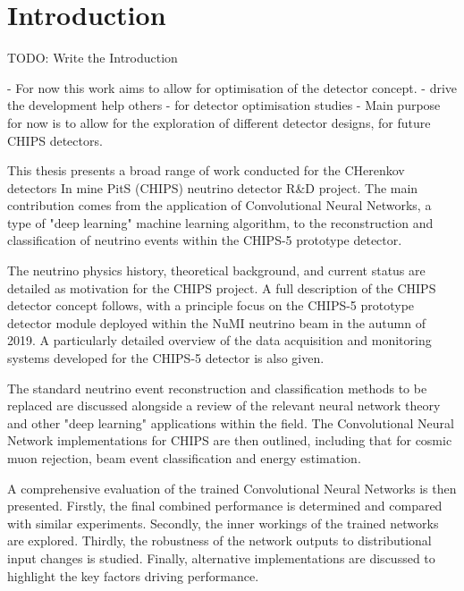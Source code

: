 \chapter{Introduction} %
\label{chap:introduction} %
\setcounter{page}{17}  %

TODO: Write the Introduction

- For now this work aims to allow for optimisation of the \chips detector concept.
- drive the development help others
- for detector optimisation studies
- Main purpose for now is to allow for the exploration of different detector designs, for future
CHIPS detectors.

This thesis presents a broad range of work conducted for the CHerenkov detectors In mine PitS
(CHIPS) neutrino detector R\&D project. The main contribution comes from the application of
Convolutional Neural Networks, a type of "deep learning" machine learning algorithm, to the
reconstruction and classification of neutrino events within the CHIPS-5 prototype detector.

The neutrino physics history, theoretical background, and current status are detailed as
motivation for the CHIPS project. A full description of the CHIPS detector concept follows, with a
principle focus on the CHIPS-5 prototype detector module deployed within the NuMI neutrino beam in
the autumn of 2019. A particularly detailed overview of the data acquisition and monitoring
systems developed for the CHIPS-5 detector is also given.

The standard neutrino event reconstruction and classification methods to be replaced are discussed
alongside a review of the relevant neural network theory and other "deep learning" applications
within the field. The Convolutional Neural Network implementations for CHIPS are then outlined,
including that for cosmic muon rejection, beam event classification and energy estimation.

A comprehensive evaluation of the trained Convolutional Neural Networks is then presented.
Firstly, the final combined performance is determined and compared with similar experiments.
Secondly, the inner workings of the trained networks are explored. Thirdly, the robustness of the
network outputs to distributional input changes is studied. Finally, alternative implementations
are discussed to highlight the key factors driving performance.

